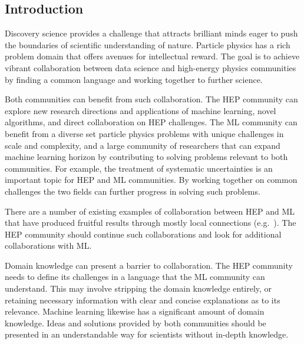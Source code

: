

\subsection{Introduction}


Discovery science provides a challenge that attracts brilliant minds eager to push the boundaries of scientific understanding of nature. Particle physics has a rich problem domain that offers avenues for intellectual reward. The goal is to achieve vibrant collaboration between data science and high-energy physics communities by finding a common language and working together to further science.


Both communities can benefit from such collaboration. The HEP community can explore new research directions and applications of machine learning, novel algorithms, and direct collaboration on HEP challenges. The ML community can benefit from a diverse set particle physics problems with unique challenges in scale and complexity, and a large community of researchers that can expand machine learning horizon by contributing to solving problems relevant to both communities. For example, the treatment of systematic uncertainties is an important topic for HEP and ML communities. By working together on common challenges the two fields can further progress in solving such problems. \medskip

There are a number of existing examples of collaboration between HEP and ML that have produced fruitful results through mostly local connections (e.g.~\cite{Likhomanenko:2016tgu,Paganini:2017hrr}). The HEP community should continue such collaborations and look for additional collaborations with ML.

Domain knowledge can present a barrier to collaboration. The HEP community needs to define its challenges in a language that the ML community can understand. This may involve stripping the domain knowledge entirely, or retaining necessary information with clear and concise explanations as to its relevance. Machine learning likewise has a significant amount of domain knowledge. Ideas and solutions provided by both communities should be presented in an understandable way for scientists without in-depth knowledge.

